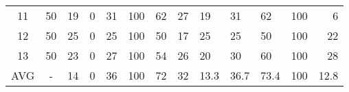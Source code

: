 \begin{table}
{{\begin{tabular}{c|c|rlllll||lll||rr}
11 & 50 & 19 & 0 & 31 & 100 & 62 & 27 & 19 & 31 & 62 & 100 &  6 \\ 

12 & 50 & 25 & 0 & 25 & 100 & 50 & 17 & 25 & 25 & 50 & 100 &  22 \\ 

13 & 50 & 23 & 0 & 27 & 100 & 54 & 26 & 20 & 30 & 60 & 100 &  28 \\ \hline

AVG & - & 14 & 0 & 36 & 100 & 72 & 32 & 13.3 & 36.7 & 73.4 & 100 & 12.8 \\ \hline

\hline\end{tabular}\centering
            }
} 
\vspace{-0.2in}
\end{table}